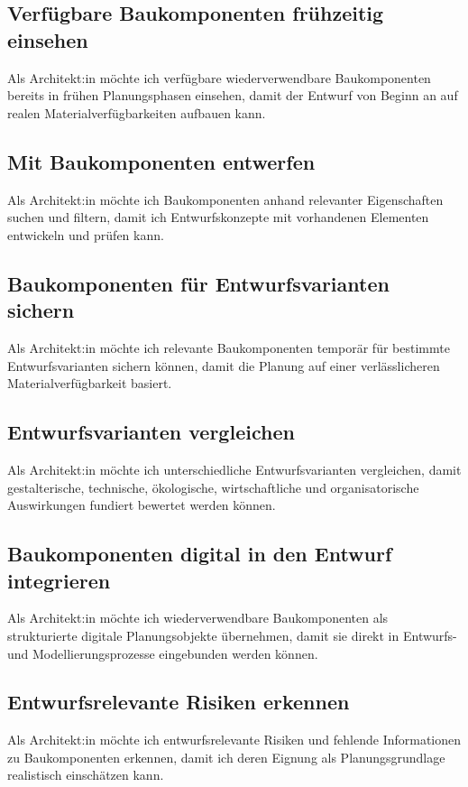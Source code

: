 
\subsection{Verfügbare Baukomponenten frühzeitig einsehen}
\label{us:a-01} Als Architekt:in möchte ich verfügbare wiederverwendbare Baukomponenten bereits in frühen Planungsphasen einsehen, damit der Entwurf von Beginn an auf realen Materialverfügbarkeiten aufbauen kann.

\subsection{Mit Baukomponenten entwerfen}
\label{us:a-02} Als Architekt:in möchte ich Baukomponenten anhand relevanter Eigenschaften suchen und filtern, damit ich Entwurfskonzepte mit vorhandenen Elementen entwickeln und prüfen kann.

\subsection{Baukomponenten für Entwurfsvarianten sichern}
\label{us:a-03} Als Architekt:in möchte ich relevante Baukomponenten temporär für bestimmte Entwurfsvarianten sichern können, damit die Planung auf einer verlässlicheren Materialverfügbarkeit basiert.

\subsection{Entwurfsvarianten vergleichen}
\label{us:a-04} Als Architekt:in möchte ich unterschiedliche Entwurfsvarianten vergleichen, damit gestalterische, technische, ökologische, wirtschaftliche und organisatorische Auswirkungen fundiert bewertet werden können.

\subsection{Baukomponenten digital in den Entwurf integrieren}
\label{us:a-05} Als Architekt:in möchte ich wiederverwendbare Baukomponenten als strukturierte digitale Planungsobjekte übernehmen, damit sie direkt in Entwurfs- und Modellierungsprozesse eingebunden werden können.

\subsection{Entwurfsrelevante Risiken erkennen}
\label{us:a-06} Als Architekt:in möchte ich entwurfsrelevante Risiken und fehlende Informationen zu Baukomponenten erkennen, damit ich deren Eignung als Planungsgrundlage realistisch einschätzen kann.


